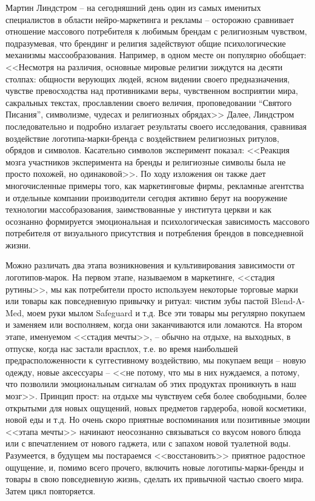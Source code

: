 Мартин Линдстром -- на сегодняшний день один из самых именитых специалистов в
области нейро-маркетинга и рекламы -- осторожно сравнивает отношение массового
потребителя к любимым брендам с религиозным чувством, подразумевая, что брендинг
и религия задействуют общие психологические механизмы массообразования. Например,
в одном месте он популярно обобщает: <<Несмотря на различия, основные мировые
религии зиждутся на десяти столпах: общности верующих людей, ясном видении
своего предназначения, чувстве превосходства над противниками веры,
чувственном восприятии мира, сакральных текстах, прославлении своего величия,
проповедовании ``Святого Писания'', символизме, чудесах и религиозных обрядах>>\autocite{lindstrom2010}
Далее, Линдстром последовательно и подробно излагает результаты своего исследования,
сравнивая воздействие логотипа-марки-бренда с воздействием религиозных ритулов,
обрядов и символов. Касательно символов эксперимент показал: <<Реакция мозга
участников эксперимента на бренды и религиозные символы была не просто похожей,
но одинаковой>>\autocite{lindstrom2010}. По ходу изложения он также дает
многочисленные примеры того, как маркетинговые фирмы, рекламные агентства
и отдельные компании производители сегодня активно берут на вооружение технологии массобразования,
заимствованные у института церкви и как осознанно формируется эмоциональная и
психологическая зависимость массового потребителя от визуального присутствия и
потребления брендов в повседневной жизни.

Можно различать два этапа возникновения и культивирования зависимости от логотипов-марок.
На первом этапе, называемом в маркетинге, <<стадия рутины>>, мы как потребители просто
используем некоторые торговые марки или товары как  повседневную привычку и ритуал:
чистим зубы пастой Blend-A-Med, моем руки мылом Safeguard и т.д. Все эти товары мы
регулярно покупаем и заменяем или восполняем, когда они заканчиваются или ломаются.
На втором этапе, именуемом <<стадия мечты>>, -- обычно на отдыхе, на выходных, в отпуске,
когда нас застали врасплох, т.е. во время наибольшей предрасположенности к
суггестивному воздействию, мы покупаем вещи -- новую одежду, новые аксессуары --
<<не потому, что мы в них нуждаемся, а потому, что позволили эмоциональным сигналам
об этих продуктах проникнуть в наш мозг>>\autocite{lindstrom2011brandwashed}.
Принцип прост: на отдыхе мы чувствуем себя более свободными, более открытыми для
новых ощущений, новых предметов гардероба, новой косметики, новой еды и т.д.
Но очень скоро приятные воспоминания или позитивные эмоции <<этапа мечты>>
начинают неосознанно связываться со вкусом нового блюда или с впечатлением
от нового гаджета, или с запахом новой туалетной воды. Разумеется, в будущем мы
постараемся <<восстановить>>  приятное радостное ощущение, и, помимо всего прочего,
включить новые логотипы-марки-бренды и товары в свою повседневную жизнь,
сделать их привычной частью своего мира. Затем цикл повторяется.

